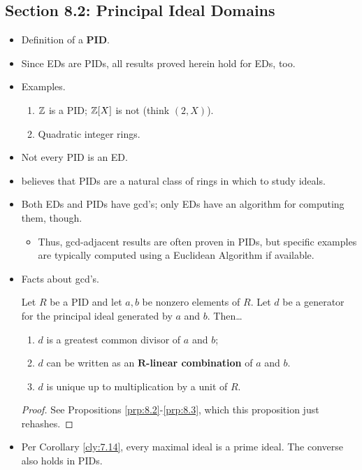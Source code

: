 \documentclass[../notes.tex]{subfiles}
\begin{document}
\subsection*{Section 8.2: Principal Ideal Domains}
\begin{itemize}
    \item {}Definition of a \textbf{PID}.
    \item Since EDs are PIDs, all results proved herein hold for EDs, too.
    \item Examples.
    \begin{enumerate}
        \item $\mathbb{Z}$ is a PID; $\mathbb{Z}[X]$ is not (think $(2,X)$).
        \item Quadratic integer rings.
    \end{enumerate}
    \item Not every PID is an ED.
    \item \textcite{bib:DummitFoote} believes that PIDs are a natural class of rings in which to study ideals.
    \item Both EDs and PIDs have gcd's; only EDs have an algorithm for computing them, though.
    \begin{itemize}
        \item Thus, gcd-adjacent results are often proven in PIDs, but specific examples are typically computed using a Euclidean Algorithm if available.
    \end{itemize}
    \item Facts about gcd's.
    \begin{proposition}\label{prp:8.6}
        Let $R$ be a PID and let $a,b$ be nonzero elements of $R$. Let $d$ be a generator for the principal ideal generated by $a$ and $b$. Then\dots
        \begin{enumerate}
            \item $d$ is a greatest common divisor of $a$ and $b$;
            \item $d$ can be written as an \textbf{$\bm{R}$-linear combination} of $a$ and $b$.
            \item $d$ is unique up to multiplication by a unit of $R$.
        \end{enumerate}
        \begin{proof}
            See Propositions \ref{prp:8.2}-\ref{prp:8.3}, which this proposition just rehashes.
        \end{proof}
    \end{proposition}
    \item Per Corollary \ref{cly:7.14}, every maximal ideal is a prime ideal. The converse also holds in PIDs.

\end{itemize}
\end{document}
